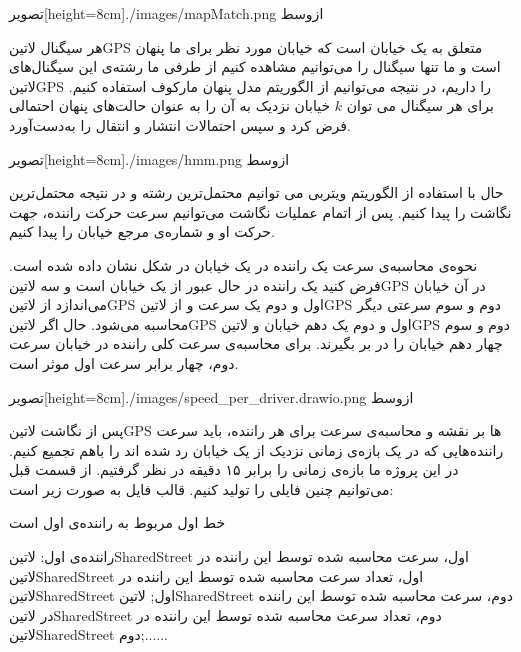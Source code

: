 

  ‌تصویر[height=8cm]{./images/mapMatch.png}
  ‌ازوسط

هر سیگنال ‌لاتین{GPS} متعلق به یک خیابان است که خیابان مورد نظر برای ما پنهان است و ما تنها سیگنال را می‌توانیم مشاهده کنیم
از طرفی ما رشته‌ی این سیگنال‌های ‌لاتین{GPS} را داریم، در نتیجه می‌توانیم از الگوریتم مدل پنهان مارکوف  استفاده کنیم.
برای هر سیگنال می توان $k$ خیابان نزدیک به آن را به عنوان حالت‌های پنهان احتمالی فرض کرد و سپس احتمالات انتشار و انتقال را به‌دست‌آورد.

  ‌تصویر[height=8cm]{./images/hmm.png}
  ‌ازوسط

حال با استفاده از الگوریتم ویتربی می توانیم محتمل‌ترین رشته و در نتیجه محتمل‌ترین نگاشت را پیدا کنیم.
پس از اتمام عملیات نگاشت می‌توانیم سرعت حرکت راننده، جهت حرکت او و شماره‌ی مرجع خیابان  را پیدا کنیم.

نحوه‌ی محاسبه‌ی سرعت یک راننده در یک خیابان در شکل  نشان داده شده است. فرض کنید یک راننده در حال عبور از یک خیابان است و سه ‌لاتین{‌GPS} در آن خیابان می‌اندازد از ‌لاتین{GPS} اول و دوم یک سرعت و از ‌لاتین{‌GPS} دوم و سوم سرعتی دیگر محاسبه می‌شود. حال اگر ‌لاتین{GPS} اول و دوم یک دهم خیابان و ‌لاتین{GPS} دوم و سوم چهار دهم خیابان را در بر بگیرند. برای محاسبه‌ی سرعت کلی راننده در خیابان سرعت دوم، چهار برابر سرعت اول موثر است.

  ‌تصویر[height=8cm]{./images/speed_per_driver.drawio.png}
  ‌ازوسط


پس از نگاشت ‌لاتین{GPS} ها بر نقشه و محاسبه‌ی سرعت برای هر راننده، باید سرعت راننده‌هایی که در یک بازه‌ی زمانی نزدیک از یک خیابان رد شده اند را باهم تجمیع کنیم. در این پروژه ما بازه‌ی زمانی را برابر ۱۵ دقیقه در نظر گرفتیم. از قسمت قبل می‌توانیم چنین فایلی را تولید کنیم. قالب فایل به صورت زیر است:

خط اول مربوط به راننده‌ی اول است

راننده‌ی اول: ‌لاتین{SharedStreet} اول، سرعت محاسبه شده توسط این راننده در ‌لاتین{SharedStreet} اول، تعداد سرعت محاسبه شده توسط این راننده در ‌لاتین{SharedStreet} اول;  ‌لاتین{SharedStreet} دوم، سرعت محاسبه شده توسط این راننده در ‌لاتین{SharedStreet} دوم، تعداد سرعت محاسبه شده توسط این راننده در ‌لاتین{SharedStreet} دوم;......

